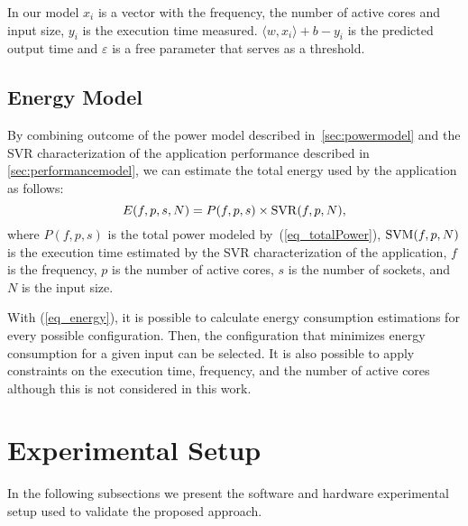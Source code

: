 
In our model $x_i$ is a vector with the frequency, the number of active cores and input size, $y_i$ is the execution time measured. $\langle w,x_i\rangle+b-y_i$ is the predicted output time and $\varepsilon$ is a free parameter that serves as a threshold.

\subsection{Energy Model} \label{sec:energymodel}
By combining outcome of the power model described in~\cref{sec:powermodel} and the SVR characterization of the application performance described in \cref{sec:performancemodel}, we can estimate the total energy used by the application as follows:
\begin{equation}
E(f,p,s,N)=P(f,p,s)\times{\rm SVR}(f,p,N) \label{eq_energy},
\end{equation}
where $P(f,p,s)$ is the total power modeled by~(\cref{eq_totalPower}), ${\rm SVM}(f,p,N)$ is the execution time estimated by the SVR characterization of the application, $f$ is the frequency, $p$ is the number of active cores, $s$ is the number of sockets, and $N$ is the input size. 

With (\ref{eq_energy}), it is possible to calculate energy consumption estimations for every possible configuration. Then, the configuration that minimizes energy consumption for a given input can be selected. It is also possible to apply constraints on the execution time, frequency, and the number of active cores although this is not considered in this work.


\section{Experimental Setup} \label{sec:experimentalsetup}
In the following subsections we present the software and hardware experimental setup used to validate the proposed approach.

